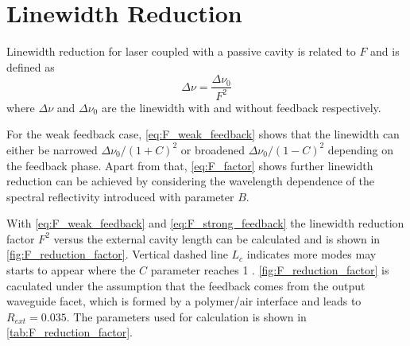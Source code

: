 \section{Linewidth Reduction}\label{sec:linewidth_reduction}
Linewidth reduction for laser coupled with a passive cavity is related to $F$ and is defined as \cite{kazarinov1987relation, petermann2012laser}
\begin{equation}
    \Delta\nu=\frac{\Delta\nu_0}{F^2}
    \label{eq:linewidth_reduction}
\end{equation}
where $\Delta\nu$ and $\Delta\nu_0$ are the linewidth with and without feedback respectively. 

For the weak feedback case, \autoref{eq:F_weak_feedback} shows that the linewidth can either be narrowed $\Delta\nu_0/(1+C)^2$ or broadened $\Delta\nu_0/(1-C)^2$ depending on the feedback phase. Apart from that, \autoref{eq:F_factor} shows further linewidth reduction can be achieved by considering the wavelength dependence of the spectral reflectivity introduced with parameter $B$.

With \autoref{eq:F_weak_feedback} and \autoref{eq:F_strong_feedback} the linewidth reduction factor $F^2$ versus the external cavity length can be calculated and is shown in \autoref{fig:F_reduction_factor}. Vertical dashed line $L_c$ indicates more modes may starts to appear where the $C$ parameter reaches 1 \cite{petermann2012laser}. \autoref{fig:F_reduction_factor} is caculated under the assumption that the feedback comes from the output waveguide facet, which is formed by a polymer/air interface and leads to $R_{ext}=0.035$. The parameters used for calculation is shown in \autoref{tab:F_reduction_factor}.

